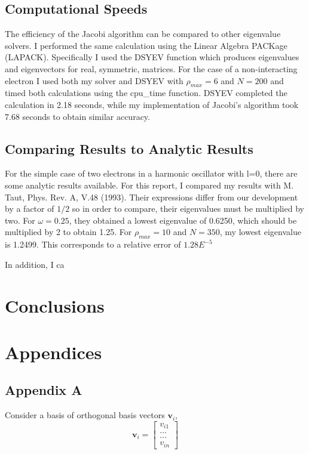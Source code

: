 \documentclass[%
oneside,                 %
final,                   %
10pt]{article}
\begin{document}
\subsection{Computational Speeds}

The efficiency of the Jacobi algorithm can be compared to other eigenvalue solvers.  I performed the same calculation using the Linear Algebra PACKage (LAPACK).  Specifically I used the DSYEV function which produces eigenvalues and eigenvectors for real, symmetric, matrices.  For the case of a non-interacting electron I used both my solver and DSYEV with $\rho_{max}=6$ and $N=200$ and timed both calculations using the cpu\_time function.  DSYEV completed the calculation in 2.18 seconds, while my implementation of Jacobi's algorithm took 7.68 seconds to obtain similar accuracy.

\subsection{Comparing Results to Analytic Results}

For the simple case of two electrons in a harmonic oscillator with l=0, there are some analytic results available.  For this report, I compared my results with M. Taut, Phys. Rev. A, V.48 (1993).  Their expressions differ from our development by a factor of $1/2$ so in order to compare, their eigenvalues must be multiplied by two.  For $\omega=0.25$, they obtained a lowest eigenvalue of 0.6250, which should be multiplied by 2 to obtain 1.25.  For $\rho_{max}=10$ and $N=350$, my lowest eigenvalue is 1.2499.  This corresponds to a relative error of $1.28 E^{-5}$

In addition, I ca

\section{Conclusions}



\section{Appendices}

\subsection{Appendix A} \label{A}

Consider a basis of orthogonal basis vectors $\mathbf{v}_i$,
\[
\mathbf{v}_i = \begin{bmatrix} v_{i1} \\ \dots \\ \dots \\v_{in} \end{bmatrix}
\]
\end{document}
